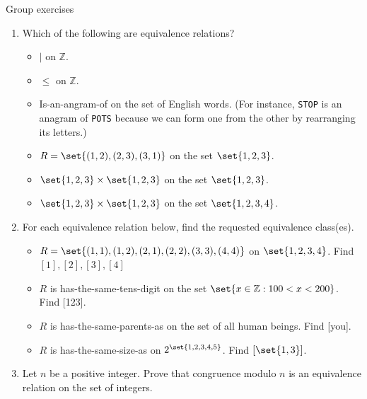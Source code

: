\documentclass[10pt]{beamer}
\begin{document}
\begin{frame}{Group exercises}
\small
\begin{enumerate}
	\item Which of the following are equivalence relations?
	\begin{itemize} \footnotesize 
	\item[a.] $|$ on $\mathbb{Z}$.
	\item[b.] $\leq$ on $\mathbb{Z}$.
	\item[c.] Is-an-angram-of on the set of English words. (For instance, \texttt{STOP} is an anagram of \texttt{POTS} because we can form one from the other by rearranging its letters.)
	\item[d.] $R=\set{(1,2),(2,3),(3,1)}$ on the set $\set{1,2,3}$.
	\item[e.] $\set{1,2,3} \times \set{1,2,3}$ on the set $\set{1,2,3}$.
	\item[f.] $\set{1,2,3} \times \set{1,2,3}$ on the set $\set{1,2,3,4}$.
	\end{itemize}
	\item For each equivalence relation below, find the requested equivalence class(es).
	\begin{itemize} \footnotesize 
	\item[a.] $R=\set{(1,1), (1,2), (2,1), (2,2), (3,3), (4,4)} $ on $\set{1,2,3,4}$. Find $[1],[2],[3],[4]$
	\item[b.] $R$ is has-the-same-tens-digit on the set $\set{x \in \mathbb{Z} : 100 < x < 200}$.  Find [123].
	\item[c.] $R$ is has-the-same-parents-as on the set of all human beings.  Find [you].
	\item[d.] $R$ is has-the-same-size-as on $2^{\set{1,2,3,4,5}}$.  Find $[\set{1,3}]$.
	\end{itemize}
\item Let $n$ be a positive integer.  Prove that congruence modulo $n$ is an equivalence relation on the set of integers.
\end{enumerate}
	
\end{frame}
\end{document}
